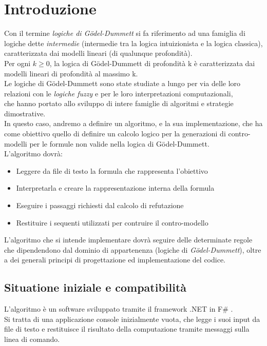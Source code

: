 \documentclass[\main/tesi.tex]{subfiles}
\begin{document}
\chapter{Introduzione}

Con il termine \textit{logiche di G\"odel-Dummett} si fa riferimento ad una famiglia di logiche dette \textit{intermedie} (intermedie tra la logica intuizionista e la logica classica),\\
caratterizzata dai modelli lineari (di qualunque profondità). \\
Per ogni $k \geq 0$, la logica di G\"odel-Dummett di profondità k è caratterizzata dai modelli lineari di profondità al massimo k. \\
Le logiche di G\"odel-Dummett sono state studiate a lungo per via delle loro relazioni con le \textit{logiche fuzzy} e per le loro interpretazioni computazionali, \\
che hanno portato allo sviluppo di intere famiglie di algoritmi e strategie dimostrative. \\
In questo caso, andremo a definire un algoritmo, e la sua implementazione, che ha come obiettivo quello di definire un calcolo logico per la generazioni di contro-modelli per le formule non valide nella logica di G\"odel-Dummett.\\
L'algoritmo dovrà:
\begin{itemize}
    \item Leggere da file di testo la formula che rappresenta l'obiettivo
    \item Interpretarla e creare la rappresentazione interna della formula
    \item Eseguire i passaggi richiesti dal calcolo di refutazione
    \item Restituire i sequenti utilizzati per contruire il contro-modello
\end{itemize}
L'algoritmo che si intende implementare dovrà seguire delle determinate regole che dipendendono dal dominio di appartenenza (logiche di \textit{G\"odel-Dummett}), oltre a dei generali principi di progettazione ed implementazione del codice.

\section{Situatione iniziale e compatibilità}

L'algoritmo è un software sviluppato tramite il framework .NET \cite{dotnet} in F\# \cite{fsharp}. \\
Si tratta di una applicazione console inizialmente vuota, che legge i suoi input da file di testo e restituisce il risultato della computazione tramite messaggi sulla linea di comando. \\
\end{document}
